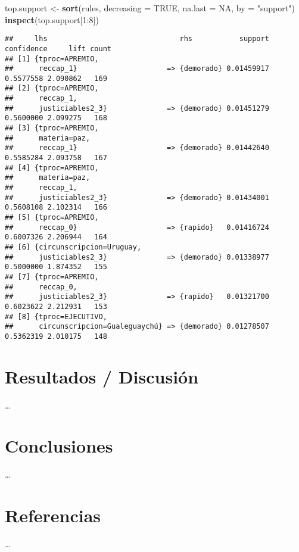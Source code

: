 \documentclass[runningheads,a4paper]{llncs}
\newenvironment{Shaded}{}{}
\newcommand{\KeywordTok}[1]{\textcolor[rgb]{0.00,0.44,0.13}{\textbf{{#1}}}}
\newcommand{\DataTypeTok}[1]{\textcolor[rgb]{0.56,0.13,0.00}{{#1}}}
\newcommand{\DecValTok}[1]{\textcolor[rgb]{0.25,0.63,0.44}{{#1}}}
\newcommand{\StringTok}[1]{\textcolor[rgb]{0.25,0.44,0.63}{{#1}}}
\newcommand{\OtherTok}[1]{\textcolor[rgb]{0.00,0.44,0.13}{{#1}}}
\newcommand{\NormalTok}[1]{{#1}}
\newcommand{\OperatorTok}[1]{\textcolor[rgb]{0.40,0.40,0.40}{{#1}}}
\begin{document}
\begin{Shaded}
\begin{Highlighting}[]
\NormalTok{top.support <-}\StringTok{ }\KeywordTok{sort}\NormalTok{(rules, }\DataTypeTok{decreasing =} \OtherTok{TRUE}\NormalTok{, }\DataTypeTok{na.last =} \OtherTok{NA}\NormalTok{, }\DataTypeTok{by =} \StringTok{"support"}\NormalTok{)}
\KeywordTok{inspect}\NormalTok{(top.support[}\DecValTok{1}\OperatorTok{:}\DecValTok{8}\NormalTok{])}
\end{Highlighting}
\end{Shaded}

\begin{verbatim}
##     lhs                               rhs           support confidence     lift count
## [1] {tproc=APREMIO,                                                                  
##      reccap_1}                     => {demorado} 0.01459917  0.5577558 2.090862   169
## [2] {tproc=APREMIO,                                                                  
##      reccap_1,                                                                       
##      justiciables2_3}              => {demorado} 0.01451279  0.5600000 2.099275   168
## [3] {tproc=APREMIO,                                                                  
##      materia=paz,                                                                    
##      reccap_1}                     => {demorado} 0.01442640  0.5585284 2.093758   167
## [4] {tproc=APREMIO,                                                                  
##      materia=paz,                                                                    
##      reccap_1,                                                                       
##      justiciables2_3}              => {demorado} 0.01434001  0.5608108 2.102314   166
## [5] {tproc=APREMIO,                                                                  
##      reccap_0}                     => {rapido}   0.01416724  0.6007326 2.206944   164
## [6] {circunscripcion=Uruguay,                                                        
##      justiciables2_3}              => {demorado} 0.01338977  0.5000000 1.874352   155
## [7] {tproc=APREMIO,                                                                  
##      reccap_0,                                                                       
##      justiciables2_3}              => {rapido}   0.01321700  0.6023622 2.212931   153
## [8] {tproc=EJECUTIVO,                                                                
##      circunscripcion=Gualeguaychú} => {demorado} 0.01278507  0.5362319 2.010175   148
\end{verbatim}

\section{Resultados / Discusión}\label{resultados-discusion}

\ldots{}

\section{Conclusiones}\label{conclusiones}

\ldots{}

\section{Referencias}\label{referencias}

\ldots{}
\end{document}
